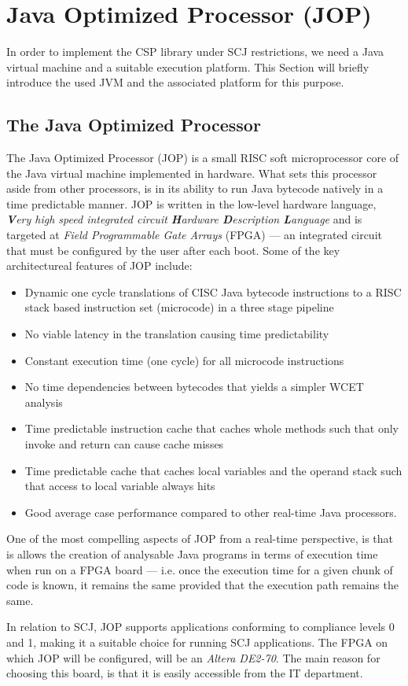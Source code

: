 \chapter{Java Optimized Processor (JOP)}
\label{chapter:jop}
In order to implement the CSP library under SCJ restrictions, we need a Java virtual machine and a suitable execution platform. This Section will briefly introduce the used JVM and the associated platform for this purpose. 

\section{The Java Optimized Processor}
The Java Optimized Processor (JOP) is a small RISC soft microprocessor core of the Java virtual machine implemented in hardware. What sets this processor aside from other processors, is in its ability to run Java bytecode natively in a time predictable manner. JOP is written in the low-level hardware language, \textit{\textbf{V}ery high speed integrated circuit \textbf{H}ardware \textbf{D}escription \textbf{L}anguage} and is targeted at \textit{Field Programmable Gate Arrays} (FPGA) --- an integrated circuit that must be configured by the user after each boot. Some of the key architectureal features of JOP include:

\begin{itemize}
 	\item Dynamic one cycle translations of CISC Java bytecode instructions to a RISC stack based instruction set (microcode) in a three stage pipeline
 	\item No viable latency in the translation causing time predictability
 	\item Constant execution time (one cycle) for all microcode instructions
 	\item No time dependencies between bytecodes that yields a simpler WCET analysis
 	\item Time predictable instruction cache that caches whole methods such that only invoke and return can cause cache misses
 	\item Time predictable cache that caches local variables and the operand stack such that access to local variable always hits
 	\item Good average case performance compared to other real-time Java processors.
\end{itemize}

One of the most compelling aspects of JOP from a real-time perspective, is that is allows the creation of analysable Java programs in terms of execution time when run on a FPGA board --- i.e. once the execution time for a given chunk of code is known, it remains the same provided that the execution path remains the same.

In relation to SCJ, JOP supports applications conforming to compliance levels 0 and 1, making it a suitable choice for running SCJ applications. The FPGA on which JOP will be configured, will be an \textit{Altera DE2-70}. The main reason for choosing this board, is that it is easily accessible from the IT department.